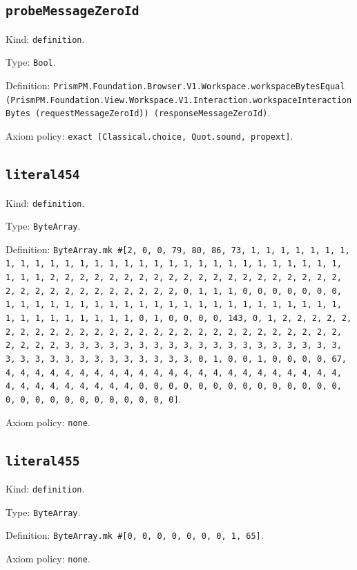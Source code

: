 \documentclass[11pt]{article}
\begin{document}
\subsection*{\texttt{probeMessageZeroId}}
\noindent Kind: \texttt{definition}.\par
\noindent Type: \texttt{Bool}.\par
\noindent Definition: \texttt{PrismPM.Foundation.Browser.V1.Workspace.workspaceBytesEqual (PrismPM.Foundation.View.Workspace.V1.Interaction.workspaceInteractionBytes (requestMessageZeroId)) (responseMessageZeroId)}.\par
\noindent Axiom policy: \texttt{exact [Classical.choice, Quot.sound, propext]}.\par
\subsection*{\texttt{literal454}}
\noindent Kind: \texttt{definition}.\par
\noindent Type: \texttt{ByteArray}.\par
\noindent Definition: \texttt{ByteArray.mk \#[2, 0, 0, 79, 80, 86, 73, 1, 1, 1, 1, 1, 1, 1, 1, 1, 1, 1, 1, 1, 1, 1, 1, 1, 1, 1, 1, 1, 1, 1, 1, 1, 1, 1, 1, 1, 1, 1, 1, 1, 2, 2, 2, 2, 2, 2, 2, 2, 2, 2, 2, 2, 2, 2, 2, 2, 2, 2, 2, 2, 2, 2, 2, 2, 2, 2, 2, 2, 2, 2, 2, 2, 0, 1, 1, 1, 0, 0, 0, 0, 0, 0, 0, 1, 1, 1, 1, 1, 1, 1, 1, 1, 1, 1, 1, 1, 1, 1, 1, 1, 1, 1, 1, 1, 1, 1, 1, 1, 1, 1, 1, 1, 1, 1, 1, 0, 1, 0, 0, 0, 0, 143, 0, 1, 2, 2, 2, 2, 2, 2, 2, 2, 2, 2, 2, 2, 2, 2, 2, 2, 2, 2, 2, 2, 2, 2, 2, 2, 2, 2, 2, 2, 2, 2, 2, 2, 3, 3, 3, 3, 3, 3, 3, 3, 3, 3, 3, 3, 3, 3, 3, 3, 3, 3, 3, 3, 3, 3, 3, 3, 3, 3, 3, 3, 3, 3, 3, 3, 0, 1, 0, 0, 1, 0, 0, 0, 0, 67, 4, 4, 4, 4, 4, 4, 4, 4, 4, 4, 4, 4, 4, 4, 4, 4, 4, 4, 4, 4, 4, 4, 4, 4, 4, 4, 4, 4, 4, 4, 4, 4, 0, 0, 0, 0, 0, 0, 0, 0, 0, 0, 0, 0, 0, 0, 0, 0, 0, 0, 0, 0, 0, 0, 0, 0, 0, 0]}.\par
\noindent Axiom policy: \texttt{none}.\par
\subsection*{\texttt{literal455}}
\noindent Kind: \texttt{definition}.\par
\noindent Type: \texttt{ByteArray}.\par
\noindent Definition: \texttt{ByteArray.mk \#[0, 0, 0, 0, 0, 0, 0, 1, 65]}.\par
\noindent Axiom policy: \texttt{none}.\par
\end{document}
